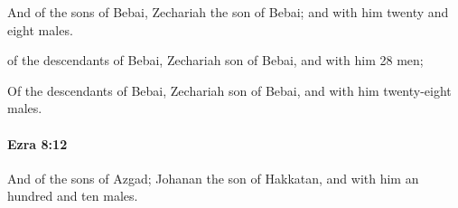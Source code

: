 			\begin{versebox}
					\item[BHS] 
					\item[LXX] 
					\item[ASV] And of the sons of Bebai, Zechariah the son of Bebai; and with him twenty and eight males.
					\item[NIV] of the descendants of Bebai, Zechariah son of Bebai, and with him 28 men;
					\item[NRSV] Of the descendants of Bebai, Zechariah son of Bebai, and with him twenty-eight males.
			\end{versebox}

		\paragraph{Ezra 8:12} %
			\label{EZRA-8-12}

			And of the sons of Azgad; Johanan the son of Hakkatan, and with him an hundred and ten males.

